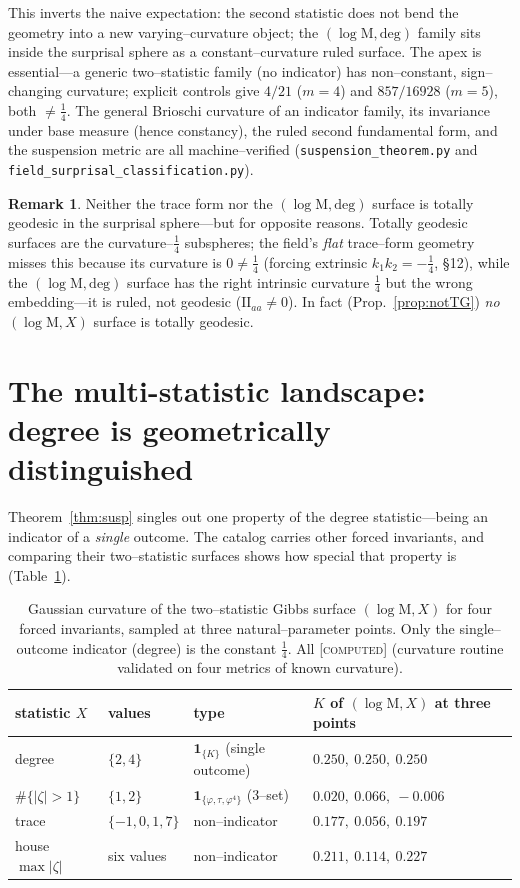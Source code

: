 \documentclass[11pt]{article}
\theoremstyle{definition}
\newtheorem{remark}[theorem]{Remark}
\newcommand{\ph}{\varphi}
\newcommand{\Mah}{\mathrm{M}}
\newcommand{\computedtag}{{\scshape [computed]}}
\begin{document}
This inverts the naive expectation: the second statistic does not bend the geometry into a new
varying--curvature object; the $(\log\Mah,\mathrm{deg})$ family sits inside the surprisal sphere as a
constant--curvature ruled surface. The apex is essential---a generic two--statistic family (no
indicator) has non--constant, sign--changing curvature; explicit controls give $4/21$ ($m=4$) and
$857/16928$ ($m=5$), both $\neq\tfrac14$. The general Brioschi curvature of an indicator family, its
invariance under base measure (hence constancy), the ruled second fundamental form, and the suspension
metric are all machine--verified (\texttt{suspension\_theorem.py} and
\texttt{field\_surprisal\_classification.py}).

\begin{remark}
Neither the trace form nor the $(\log\Mah,\mathrm{deg})$ surface is totally geodesic in the surprisal
sphere---but for opposite reasons. Totally geodesic surfaces are the curvature--$\tfrac14$ subspheres;
the field's \emph{flat} trace--form geometry misses this because its curvature is $0\neq\tfrac14$
(forcing extrinsic $k_1k_2=-\tfrac14$, \S12), while the $(\log\Mah,\mathrm{deg})$ surface has the right
intrinsic curvature $\tfrac14$ but the wrong embedding---it is ruled, not geodesic ($\mathrm{II}_{aa}
\neq0$). In fact (Prop.~\ref{prop:notTG}) \emph{no} $(\log\Mah,X)$ surface is totally geodesic.
\end{remark}

\section{The multi-statistic landscape: degree is geometrically distinguished}\label{sec:landscape}
Theorem~\ref{thm:susp} singles out one property of the degree statistic---being an indicator of a
\emph{single} outcome. The catalog carries other forced invariants, and comparing their two--statistic
surfaces shows how special that property is (Table~\ref{tab:landscape}).

\begin{table}[h]\centering
\begin{tabular}{llll}
\toprule
statistic $X$ & values & type & $K$ of $(\log\Mah,X)$ at three points\\ \midrule
degree & $\{2,4\}$ & $\mathbf 1_{\{K\}}$ (single outcome) & $0.250,\ 0.250,\ 0.250$\\
$\#\{|\zeta|>1\}$ & $\{1,2\}$ & $\mathbf 1_{\{\ph,\tau,\ph^4\}}$ ($3$--set) & $0.020,\ 0.066,\ -0.006$\\
trace & $\{-1,0,1,7\}$ & non--indicator & $0.177,\ 0.056,\ 0.197$\\
house $\max|\zeta|$ & six values & non--indicator & $0.211,\ 0.114,\ 0.227$\\
\bottomrule
\end{tabular}
\caption{Gaussian curvature of the two--statistic Gibbs surface $(\log\Mah,X)$ for four forced
invariants, sampled at three natural--parameter points. Only the single--outcome indicator (degree)
is the constant $\tfrac14$. All \computedtag{} (curvature routine validated on four metrics of known
curvature).}\label{tab:landscape}
\end{table}
\end{document}
